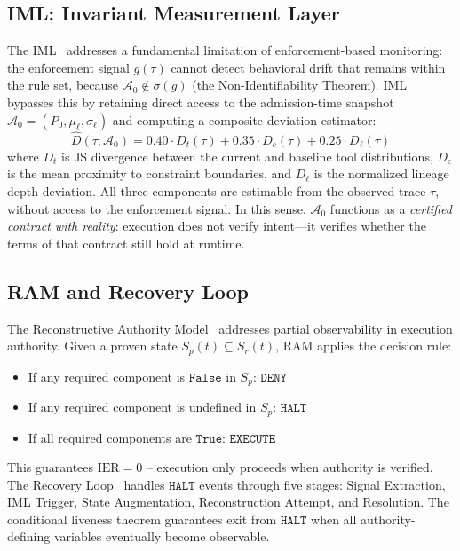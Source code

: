 \documentclass[11pt]{article}
\newcommand{\Azero}{\mathcal{A}_0}
\newcommand{\Dhat}{\widehat{D}}
\newcommand{\Sp}{S_p}
\newcommand{\Sr}{S_r}
\newcommand{\IER}{\mathrm{IER}}
\newcommand{\DENY}{\texttt{DENY}}
\newcommand{\EXECUTE}{\texttt{EXECUTE}}
\newcommand{\HALT}{\texttt{HALT}}
\begin{document}
\subsection{IML: Invariant Measurement Layer}
\label{sec:bg-iml}

The IML~\cite{fernandez2026iml} addresses a fundamental limitation of
enforcement-based monitoring: the enforcement signal $g(\tau)$ cannot detect
behavioral drift that remains within the rule set, because $\Azero \notin
\sigma(g)$ (the Non-Identifiability Theorem).
IML bypasses this by retaining direct access to the admission-time snapshot
$\Azero = (P_0, \mu_\ell, \sigma_\ell)$ and computing a composite deviation
estimator:
\[
  \Dhat(\tau;\Azero) = 0.40\cdot D_t(\tau) + 0.35\cdot D_c(\tau) +
  0.25\cdot D_\ell(\tau)
\]
where $D_t$ is JS divergence between the current and baseline tool
distributions, $D_c$ is the mean proximity to constraint boundaries,
and $D_\ell$ is the normalized lineage depth deviation.
All three components are estimable from the observed trace $\tau$,
without access to the enforcement signal.
In this sense, $\Azero$ functions as a \emph{certified contract with
reality}: execution does not verify intent---it verifies whether the
terms of that contract still hold at runtime.

\subsection{RAM and Recovery Loop}
\label{sec:bg-ram}

The Reconstructive Authority Model~\cite{fernandez2026ram} addresses partial
observability in execution authority.
Given a proven state $\Sp(t) \subseteq \Sr(t)$, RAM applies the decision rule:
\begin{itemize}[leftmargin=2em, topsep=0pt]
  \item If any required component is $\mathtt{False}$ in $\Sp$: $\DENY$
  \item If any required component is undefined in $\Sp$: $\HALT$
  \item If all required components are $\mathtt{True}$: $\EXECUTE$
\end{itemize}
This guarantees $\IER=0$ -- execution only proceeds when authority is verified.
The Recovery Loop~\cite{fernandez2026opram} handles $\HALT$ events through
five stages: Signal Extraction, IML Trigger, State Augmentation,
Reconstruction Attempt, and Resolution.
The conditional liveness theorem guarantees exit from $\HALT$ when all
authority-defining variables eventually become observable.
\end{document}
